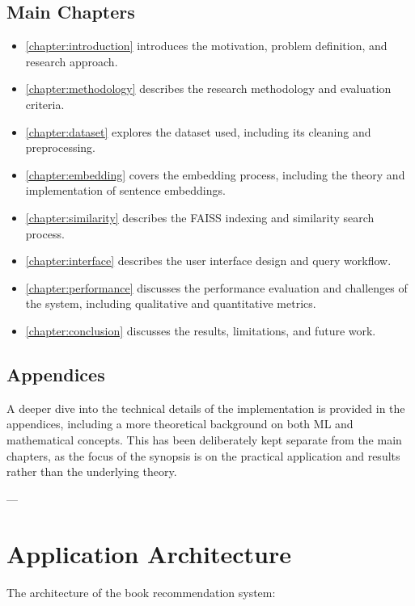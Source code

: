 \subsection{Main Chapters}
\begin{itemize}
    \item \cref{chapter:introduction} introduces the motivation, problem definition, and research approach.
    \item \cref{chapter:methodology} describes the research methodology and evaluation criteria.
    \item \cref{chapter:dataset} explores the dataset used, including its cleaning and preprocessing. 
    \item \cref{chapter:embedding} covers the embedding process, including the theory and implementation of sentence embeddings. 
    \item \cref{chapter:similarity} describes the FAISS indexing and similarity search process.
    \item \cref{chapter:interface} describes the user interface design and query workflow.
    \item \cref{chapter:performance} discusses the performance evaluation and challenges of the system, including qualitative and quantitative metrics.
    \item \cref{chapter:conclusion} discusses the results, limitations, and future work.
\end{itemize}

\subsection{Appendices}
A deeper dive into the technical details of the implementation is provided in the appendices, including a more theoretical background on both ML and mathematical concepts.
This has been deliberately kept separate from the main chapters, as the focus of the synopsis is on the practical application and results rather than the underlying theory.

---

\section{Application Architecture}
\label{sec:application-architecture}
The architecture of the book recommendation system:


